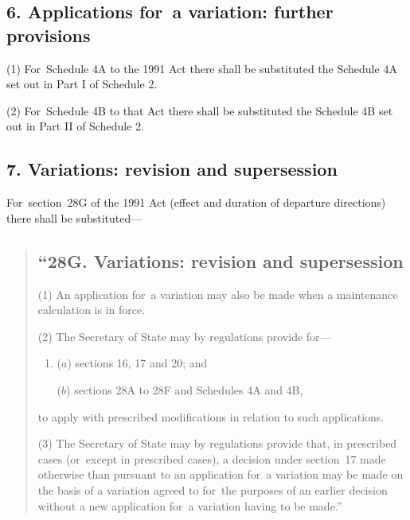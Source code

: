 \documentclass[12pt,a4paper]{article}
\begin{document}

\subsection{6. Applications for~a variation: further provisions}

(1) For~Schedule 4A to the 1991 Act there shall be substituted the Schedule 4A set out in Part I of Schedule 2. 

(2) For~Schedule 4B to that Act  there shall be substituted the Schedule 4B set out in Part II of Schedule 2. 


\subsection{7. Variations: revision and supersession}

For~section~28G of the 1991 Act (effect and duration of departure directions) there shall be substituted—
\begin{quotation}
\subsection*{“28G. Variations: revision and supersession}

(1) An application for~a variation may also be made when a maintenance calculation is in force.

(2) The Secretary of State may by regulations provide for—
\begin{enumerate}\item[]
($a$) sections 16, 17 and 20; and

($b$) sections 28A to 28F and Schedules 4A and 4B,
\end{enumerate}
to apply with prescribed modifications in relation to such applications.

(3) The Secretary of State may by regulations provide that, in prescribed cases (or~except in prescribed cases), a decision under section~17 made otherwise than pursuant to an application for~a variation may be made on the basis of a variation agreed to for~the purposes of an earlier decision without a new application for~a variation having to be made.”
\end{quotation}
\end{document}
